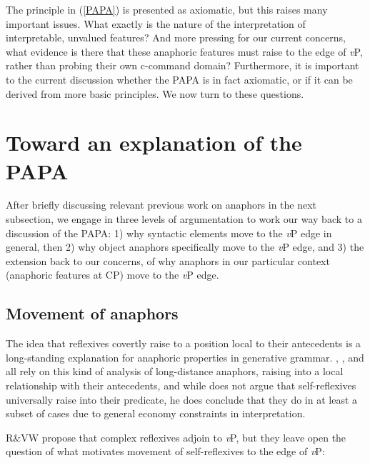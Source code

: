\documentclass[output=paper
,modfonts
,nonflat
]{langsci/langscibook}
\begin{document}
The principle in (\ref{PAPA}) is presented as axiomatic, but this raises many important issues. What exactly is the nature of the interpretation of interpretable, unvalued features? And more pressing for our current concerns, what evidence is there that these anaphoric features must raise to the edge of \textit{v}P, rather than probing their own c-command domain? Furthermore, it is important to the current discussion whether the PAPA is in fact axiomatic, or if it can be derived from more basic principles. We now turn to these questions.

\section{Toward an explanation of the PAPA} \label{ExplainPAPA}

After briefly discussing relevant previous work on anaphors in the next subsection, we engage in three levels of argumentation to work our way back to a discussion of the PAPA: 1) why syntactic elements move to the \textit{v}P edge in general, then 2) why object anaphors specifically move to the \textit{v}P edge, and 3) the extension back to our concerns, of why anaphors in our particular context (anaphoric features at CP) move to the \textit{v}P edge. 

\subsection{Movement of anaphors}
The idea that reflexives covertly raise to a position local to their antecedents is a long-standing explanation for anaphoric properties in generative grammar. \citet{Safir:2004}, \citet{Pica:1987}, and \citet{Cole:1990} all rely on this kind of analysis of long-distance anaphors, raising into a local relationship with their antecedents, and while \citet{Reuland:2011} does not argue that self-reflexives universally raise into their predicate, he does conclude that they do in at least a subset of cases due to general economy constraints in interpretation. 

R\&VW propose that complex reflexives adjoin to \textit{v}P, but they leave open the question of what motivates movement of self-reflexives to the edge of \textit{v}P: 
\end{document}
